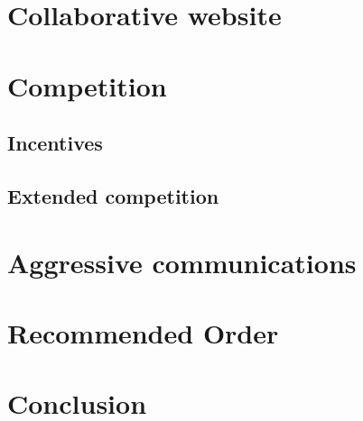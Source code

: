 \documentclass[11pt]{article}
\begin{document}
\section{Collaborative website}

\section{Competition}

\subsection{Incentives}

\subsection{Extended competition}

\section{Aggressive communications}


\section{Recommended Order}

\section{Conclusion}





%
%
\end{document}
